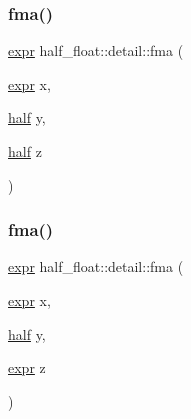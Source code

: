 \subsubsection{\texorpdfstring{fma()}{fma()}\hspace{0.1cm}{\footnotesize\ttfamily [5/8]}}
{\footnotesize\ttfamily \hyperlink{structhalf__float_1_1detail_1_1expr}{expr} half\+\_\+float\+::detail\+::fma (\begin{DoxyParamCaption}\item[{\hyperlink{structhalf__float_1_1detail_1_1expr}{expr}}]{x,  }\item[{\hyperlink{classhalf__float_1_1half}{half}}]{y,  }\item[{\hyperlink{classhalf__float_1_1half}{half}}]{z }\end{DoxyParamCaption})\hspace{0.3cm}{\ttfamily [inline]}}

\mbox{\label{namespacehalf__float_1_1detail_a8ad5fde03f4a89ee0a6febefff2b2951}} 
\subsubsection{\texorpdfstring{fma()}{fma()}\hspace{0.1cm}{\footnotesize\ttfamily [6/8]}}
{\footnotesize\ttfamily \hyperlink{structhalf__float_1_1detail_1_1expr}{expr} half\+\_\+float\+::detail\+::fma (\begin{DoxyParamCaption}\item[{\hyperlink{structhalf__float_1_1detail_1_1expr}{expr}}]{x,  }\item[{\hyperlink{classhalf__float_1_1half}{half}}]{y,  }\item[{\hyperlink{structhalf__float_1_1detail_1_1expr}{expr}}]{z }\end{DoxyParamCaption})\hspace{0.3cm}{\ttfamily [inline]}}

\mbox{\label{namespacehalf__float_1_1detail_a4e699585abe71ccdf22a16eaa9fbdf2f}} 
